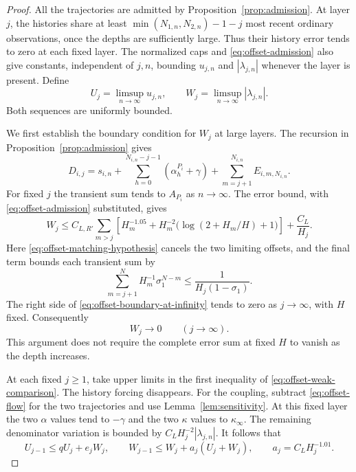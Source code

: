\begin{proof}
All the trajectories are admitted by Proposition~\ref{prop:admission}.
At layer $j$, the histories share at least
$\min(N_{1,n},N_{2,n})-1-j$ most recent ordinary observations,
once the depths are sufficiently large.  Thus their history error
tends to zero at each fixed layer.  The normalized caps and
\eqref{eq:offset-admission} also give constants, independent of
$j,n$, bounding $u_{j,n}$ and $|\lambda_{j,n}|$ whenever the layer
is present.  Define
\[
 U_j=\limsup_{n\to\infty}u_{j,n},\qquad
 W_j=\limsup_{n\to\infty}|\lambda_{j,n}|.
\]
Both sequences are uniformly bounded.

We first establish the boundary condition for $W_j$ at large
layers.  The recursion in Proposition~\ref{prop:admission} gives
\[
 D_{i,j}=s_{i,n}
       +\sum_{h=0}^{N_{i,n}-j-1}(\alpha_h^{P_i}+\gamma)
       +\sum_{m=j+1}^{N_{i,n}}E_{i,m,N_{i,n}}.
\]
For fixed $j$ the transient sum tends to $A_{P_i}$ as
$n\to\infty$.  The error bound, with
\eqref{eq:offset-admission} substituted, gives
\begin{equation}
 W_j\le C_{L,R'}\sum_{m>j}
       \left[H_m^{-1.05}
          +H_m^{-2}\bigl(\log(2+H_m/H)+1\bigr)\right]
       +\frac{C_L}{H_j}.
 \label{eq:offset-boundary-at-infinity}
\end{equation}
Here \eqref{eq:offset-matching-hypothesis} cancels the two limiting
offsets, and the final term bounds each transient sum by
\[
 \sum_{m=j+1}^{N}H_m^{-1}\sigma_1^{N-m}
                 \le \frac1{H_j(1-\sigma_1)}.
\]
The right side of \eqref{eq:offset-boundary-at-infinity} tends to
zero as $j\to\infty$, with $H$ fixed.  Consequently
\begin{equation}
 W_j\longrightarrow0\qquad(j\longrightarrow\infty).
 \label{eq:offset-W-boundary}
\end{equation}
This argument does not require the complete error sum at fixed $H$
to vanish as the depth increases.

At each fixed $j\ge1$, take upper limits in the first inequality of
\eqref{eq:offset-weak-comparison}.  The history forcing disappears.
For the coupling, subtract \eqref{eq:offset-flow} for the two
trajectories and use Lemma~\ref{lem:sensitivity}.  At this fixed
layer the two $\alpha$ values tend to $-\gamma$ and the two
$\kappa$ values to $\kappa_\infty$.  The remaining denominator
variation is bounded by $C_LH_j^{-2}|\lambda_{j,n}|$.
It follows that
\begin{equation}
 U_{j-1}\le qU_j+e_jW_j,\qquad
 W_{j-1}\le W_j+a_j(U_j+W_j),\qquad
 a_j=C_LH_j^{-1.01}.
 \label{eq:offset-limsup-recursions}
\end{equation}


\end{proof}
